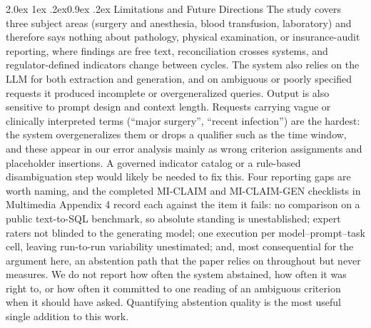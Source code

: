 \documentclass[10pt,twocolumn]{article}
\makeatletter
\renewcommand\subsection{\@startsection{subsection}{2}{\z@}%
  {2.0ex \@plus 1ex \@minus .2ex}{0.9ex \@plus .2ex}%
  {\normalfont\normalsize\bfseries}}
\makeatother
\begin{document}
\subsection{Limitations and Future Directions}
The study covers three subject areas (surgery and anesthesia, blood transfusion, laboratory) and therefore says nothing about pathology, physical examination, or insurance-audit reporting, where findings are free text, reconciliation crosses systems, and regulator-defined indicators change between cycles. The system also relies on the LLM for both extraction and generation, and on ambiguous or poorly specified requests it produced incomplete or overgeneralized queries.
Output is also sensitive to prompt design and context length. Requests carrying vague or clinically interpreted terms (``major surgery'', ``recent infection'') are the hardest: the system overgeneralizes them or drops a qualifier such as the time window, and these appear in our error analysis mainly as wrong criterion assignments and placeholder insertions. A governed indicator catalog or a rule-based disambiguation step would likely be needed to fix this. Four reporting gaps are worth naming, and the completed MI-CLAIM and MI-CLAIM-GEN checklists in Multimedia Appendix 4 record each against the item it fails: no comparison on a public text-to-SQL benchmark, so absolute standing is unestablished; expert raters not blinded to the generating model; one execution per model--prompt--task cell, leaving run-to-run variability unestimated; and, most consequential for the argument here, an abstention path that the paper relies on throughout but never measures. We do not report how often the system abstained, how often it was right to, or how often it committed to one reading of an ambiguous criterion when it should have asked. Quantifying abstention quality is the most useful single addition to this work.
\end{document}
